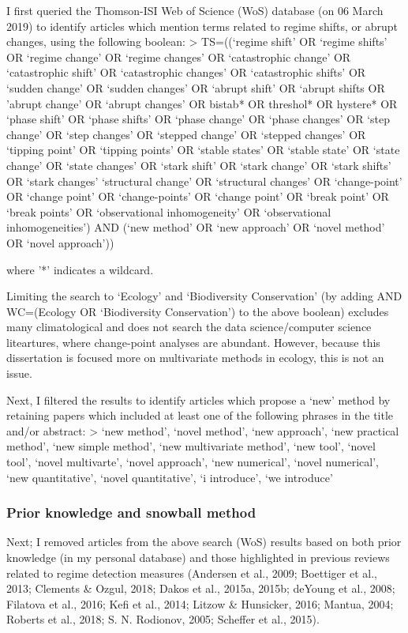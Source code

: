 \documentclass[12pt,twoside,openany]{reedthesis}
\begin{document}
I first queried the Thomson-ISI Web of Science (WoS) database (on 06
March 2019) to identify articles which mention terms related to regime
shifts, or abrupt changes, using the following boolean: \textgreater{}
TS=((`regime shift' OR `regime shifts' OR `regime change' OR `regime
changes' OR `catastrophic change' OR `catastrophic shift' OR
`catastrophic changes' OR `catastrophic shifts' OR `sudden change' OR
`sudden changes' OR `abrupt shift' OR `abrupt shifts OR 'abrupt change'
OR `abrupt changes' OR bistab* OR threshol* OR hystere* OR `phase shift'
OR `phase shifts' OR `phase change' OR `phase changes' OR `step change'
OR `step changes' OR `stepped change' OR `stepped changes' OR `tipping
point' OR `tipping points' OR `stable states' OR `stable state' OR
`state change' OR `state changes' OR `stark shift' OR `stark change' OR
`stark shifts' OR `stark changes' `structural change' OR `structural
changes' OR `change-point' OR `change point' OR `change-points' OR
`change point' OR `break point' OR `break points' OR `observational
inhomogeneity' OR `observational inhomogeneities') AND (`new method' OR
`new approach' OR `novel method' OR `novel approach'))

where '*' indicates a wildcard.

Limiting the search to `Ecology' and `Biodiversity Conservation' (by
adding AND WC=(Ecology OR `Biodiversity Conservation') to the above
boolean) excludes many climatological and does not search the data
science/computer science liteartures, where change-point analyses are
abundant. However, because this dissertation is focused more on
multivariate methods in ecology, this is not an issue.

Next, I filtered the results to identify articles which propose a `new'
method by retaining papers which included at least one of the following
phrases in the title and/or abstract: \textgreater{} `new method',
`novel method', `new approach', `new practical method', `new simple
method', `new multivariate method', `new tool', `novel tool', `novel
multivarte', `novel approach', `new numerical', `novel numerical', `new
quantitative', `novel quantitative', `i introduce', `we introduce'

\subsubsection{Prior knowledge and snowball
method}\label{prior-knowledge-and-snowball-method}

Next; I removed articles from the above search (WoS) results based on
both prior knowledge (in my personal database) and those highlighted in
previous reviews related to regime detection measures (Andersen et al.,
2009; Boettiger et al., 2013; Clements \& Ozgul, 2018; Dakos et al.,
2015a, 2015b; deYoung et al., 2008; Filatova et al., 2016; Kefi et al.,
2014; Litzow \& Hunsicker, 2016; Mantua, 2004; Roberts et al., 2018; S.
N. Rodionov, 2005; Scheffer et al., 2015).
\end{document}
